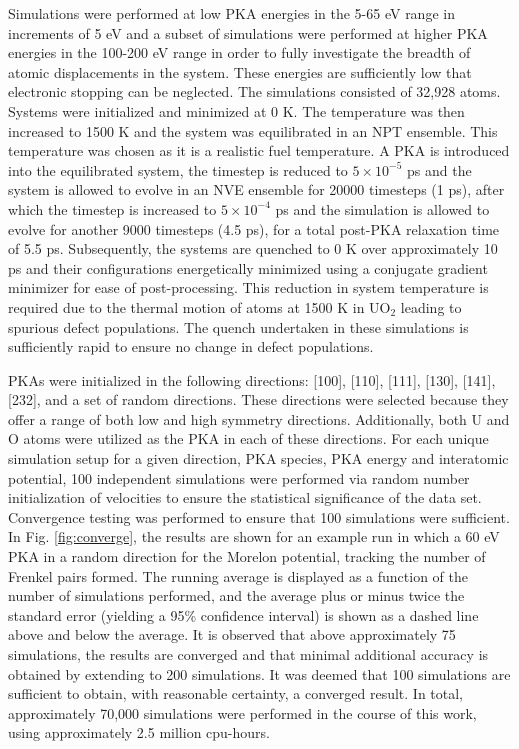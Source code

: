 \documentclass[review]{elsarticle}
\begin{document}
Simulations were performed at low PKA energies in the 5-65 eV range in increments of 5 eV and a subset of simulations were performed at higher PKA energies in the 100-200 eV range in order to fully investigate the breadth of atomic displacements in the system. These energies are sufficiently low that electronic stopping can be neglected. The simulations consisted of 32,928 atoms. Systems were initialized and minimized at 0 K. The temperature was then increased to 1500 K and the system was equilibrated in an NPT ensemble. This temperature was chosen as it is a realistic fuel temperature. A PKA is introduced into the equilibrated system, the timestep is reduced to $5\times10^{-5}$ ps and the system is allowed to evolve in an NVE ensemble for 20000 timesteps (1 ps), after which the timestep is increased to $5\times10^{-4}$ ps and the simulation is allowed to evolve for another 9000 timesteps (4.5 ps), for a total post-PKA relaxation time of 5.5 ps. Subsequently, the systems are quenched to 0 K over approximately 10 ps and their configurations energetically minimized using a conjugate gradient minimizer for ease of post-processing. This reduction in system temperature is required due to the thermal motion of atoms at 1500 K in UO$_2$ leading to spurious defect populations. The quench undertaken in these simulations is sufficiently rapid to ensure no change in defect populations.

PKAs were initialized in the following directions: [100], [110], [111], [130], [141], [232], and a set of random directions. These directions were selected because they offer a range of both low and high symmetry directions. Additionally, both U and O atoms were utilized as the PKA in each of these directions. For each unique simulation setup for a given direction, PKA species, PKA energy and interatomic potential, 100 independent simulations were performed via random number initialization of velocities to ensure the statistical significance of the data set. Convergence testing was performed to ensure that 100 simulations were sufficient. In Fig. \ref{fig:converge}, the results are shown for an example run in which a 60 eV PKA in a random direction for the Morelon potential, tracking the number of Frenkel pairs formed. The running average is displayed as a function of the number of simulations performed, and the average plus or minus twice the standard error (yielding a 95\% confidence interval) is shown as a dashed line above and below the average. It is observed that above approximately 75 simulations, the results are converged and that minimal additional accuracy is obtained by extending to 200 simulations. It was deemed that 100 simulations are sufficient to obtain, with reasonable certainty, a converged result. In total, approximately 70,000 simulations were performed in the course of this work, using approximately 2.5 million cpu-hours.
\end{document}
